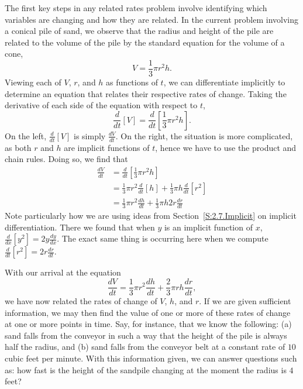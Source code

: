 The first key steps in any related rates problem involve identifying which variables are changing and how they are related.  In the current problem involving a conical pile of sand, we observe that the radius and height of the pile are related to the volume of the pile by the standard equation for the volume of a cone,
$$V = \frac{1}{3} \pi r^2 h.$$
Viewing each of $V$, $r$, and $h$ as functions of $t$, we can differentiate implicitly to determine an equation that relates their respective rates of change.  Taking the derivative of each side of the equation with respect to $t$, 
$$\frac{d}{dt}[V] = \frac{d}{dt}\left[\frac{1}{3} \pi r^2 h\right].$$
On the left, $\frac{d}{dt}[V]$ is simply $\frac{dV}{dt}$.  On the right, the situation is more complicated, as both $r$ and $h$ are implicit functions of $t$, hence we have to use the product and chain rules.  Doing so, we find that
\begin{align*}
\frac{dV}{dt} & =  \frac{d}{dt}\left[\frac{1}{3} \pi r^2 h\right] \\
& = \frac{1}{3} \pi r^2 \frac{d}{dt}[h] + \frac{1}{3} \pi h \frac{d}{dt}[r^2] \\
& =  \frac{1}{3} \pi r^2 \frac{dh}{dt} + \frac{1}{3} \pi h 2r \frac{dr}{dt}
\end{align*}
Note particularly how we are using ideas from Section~\ref{S:2.7.Implicit} on implicit differentiation.  There we found that when $y$ is an implicit function of $x$, $\frac{d}{dx}[y^2] = 2y \frac{dy}{dx}$.  The exact same thing is occurring here when we compute $\frac{d}{dt}[r^2] = 2r \frac{dr}{dt}$.

With our arrival at the equation
$$
\frac{dV}{dt} = \frac{1}{3} \pi r^2 \frac{dh}{dt} + \frac{2}{3} \pi rh \frac{dr}{dt},
$$
we have now related the rates of change of $V$, $h$, and $r$.  If we are given sufficient information, we may then find the value of one or more of these rates of change at one or more points in time.  Say, for instance, that we know the following:  (a) sand falls from the conveyor in such a way that the height of the pile is always half the radius, and (b) sand falls from the conveyor belt at a constant rate of $10$ cubic feet per minute.  With this information given, we can answer questions such as: how fast is the height of the sandpile changing at the moment the radius is $4$ feet?

